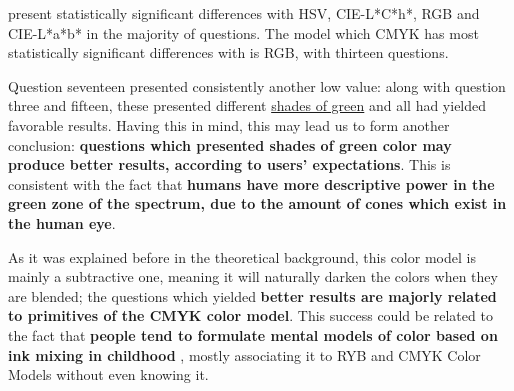 present statistically significant differences with HSV, CIE-L*C*h*, RGB and CIE-L*a*b* in the majority of questions. The model which CMYK has most statistically significant differences with is RGB, with thirteen questions. \par
%
Question seventeen presented consistently another low value: along with question three and fifteen, these presented different \ul{shades of green} and all had yielded favorable results. Having this in mind, this may lead us to
form another conclusion: \textbf{questions which presented shades of green color may produce better results, according to users' expectations}. This is consistent with the fact that \textbf{humans have more descriptive power
in the green zone of the spectrum, due to the amount of cones which exist in the human eye}. \par
%
As it was explained before in the theoretical background, this color model is mainly a subtractive one, meaning it will naturally darken the colors when they are blended; the questions which yielded \textbf{better results are majorly
related to primitives of the CMYK color model}. This success could be related to the fact that \textbf{people tend to formulate mental models of color based on ink mixing in childhood} \cite{Gossett2004}, mostly associating it to
RYB and CMYK Color Models without even knowing it. \par
%
